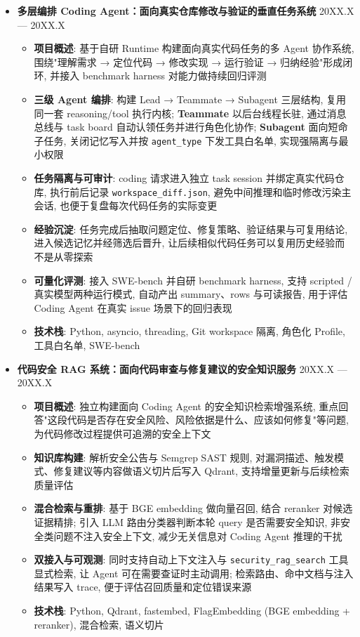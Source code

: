 \begin{itemize}
    \item \textbf{多层编排 Coding Agent：面向真实仓库修改与验证的垂直任务系统} \hfill 20XX.X --- 20XX.X
    \begin{itemize}
        \item \textbf{项目概述}: 基于自研 Runtime 构建面向真实代码任务的多 Agent 协作系统, 围绕"理解需求 → 定位代码 → 修改实现 → 运行验证 → 归纳经验"形成闭环, 并接入 benchmark harness 对能力做持续回归评测
        \item \textbf{三级 Agent 编排}: 构建 Lead → Teammate → Subagent 三层结构, 复用同一套 reasoning/tool 执行内核; \textbf{Teammate} 以后台线程长驻, 通过消息总线与 task board 自动认领任务并进行角色化协作; \textbf{Subagent} 面向短命子任务, 关闭记忆写入并按 \texttt{agent\_type} 下发工具白名单, 实现强隔离与最小权限
        \item \textbf{任务隔离与可审计}: coding 请求进入独立 task session 并绑定真实代码仓库, 执行前后记录 \texttt{workspace\_diff.json}, 避免中间推理和临时修改污染主会话, 也便于复盘每次代码任务的实际变更
        \item \textbf{经验沉淀}: 任务完成后抽取问题定位、修复策略、验证结果与可复用结论, 进入候选记忆并经筛选后晋升, 让后续相似代码任务可以复用历史经验而不是从零探索
        \item \textbf{可量化评测}: 接入 SWE-bench 并自研 benchmark harness, 支持 scripted / 真实模型两种运行模式, 自动产出 summary、rows 与可读报告, 用于评估 Coding Agent 在真实 issue 场景下的回归表现
        \item \textbf{技术栈}: Python, asyncio, threading, Git workspace 隔离, 角色化 Profile, 工具白名单, SWE-bench
    \end{itemize}

    \item \textbf{代码安全 RAG 系统：面向代码审查与修复建议的安全知识服务} \hfill 20XX.X --- 20XX.X
    \begin{itemize}
        \item \textbf{项目概述}: 独立构建面向 Coding Agent 的安全知识检索增强系统, 重点回答"这段代码是否存在安全风险、风险依据是什么、应该如何修复"等问题, 为代码修改过程提供可追溯的安全上下文
        \item \textbf{知识库构建}: 解析安全公告与 Semgrep SAST 规则, 对漏洞描述、触发模式、修复建议等内容做语义切片后写入 Qdrant, 支持增量更新与后续检索质量评估
        \item \textbf{混合检索与重排}: 基于 BGE embedding 做向量召回, 结合 reranker 对候选证据精排; 引入 LLM 路由分类器判断本轮 query 是否需要安全知识, 非安全类问题不注入安全上下文, 减少无关信息对 Coding Agent 推理的干扰
        \item \textbf{双接入与可观测}: 同时支持自动上下文注入与 \texttt{security\_rag\_search} 工具显式检索, 让 Agent 可在需要查证时主动调用; 检索路由、命中文档与注入结果写入 trace, 便于评估召回质量和定位错误来源
        \item \textbf{技术栈}: Python, Qdrant, fastembed, FlagEmbedding (BGE embedding + reranker), 混合检索, 语义切片
    \end{itemize}
\end{itemize}
